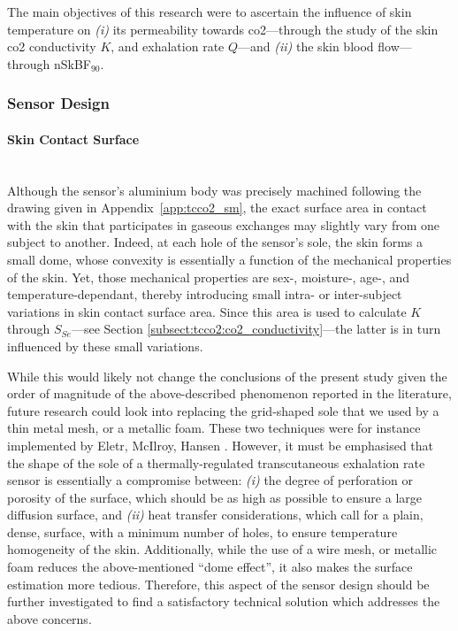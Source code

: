 The main objectives of this research were to ascertain the influence of skin temperature on \textit{(i)} its permeability towards \gls{co2}---through the study of the skin \gls{co2} conductivity $K$, and exhalation rate $Q$---and \textit{(ii)} the skin blood flow---through nSkBF$_{90}$.

\subsubsection{Sensor Design}

\paragraph{Skin Contact Surface}\label{subsect:tcco2:skin_surface}\makebox{}\\

Although the sensor's aluminium body was precisely machined following the drawing given in Appendix~\ref{app:tcco2_sm}, the exact surface area in contact with the skin that participates in gaseous exchanges may slightly vary from one subject to another. Indeed, at each hole of the sensor's sole, the skin forms a small dome, whose convexity is essentially a function of the mechanical properties of the skin. Yet, those mechanical properties are sex-, moisture-, age-, and temperature-dependant\cite{salter1993, held2018}, thereby introducing small intra- or inter-subject variations in skin contact surface area. Since this area is used to calculate $K$ through $S_{Se}$---see Section \ref{subsect:tcco2:co2_conductivity}---the latter is in turn influenced by these small variations.

While this would likely not change the conclusions of the present study given the order of magnitude of the above-described phenomenon reported in the literature, \mfrin{}future research could look into replacing the grid-shaped sole that we used by a thin metal mesh, or a metallic foam. These two techniques were for instance implemented by Eletr, McIlroy, Hansen \etal{}\cite{eletr1978, mcilroy1978, hansen1980}. However, it must be emphasised that the shape of the sole of a thermally-regulated transcutaneous exhalation rate sensor is essentially a compromise between: \emph{(i)} the degree of perforation or porosity of the surface, which should be as high as possible to ensure a large diffusion surface, and \emph{(ii)} heat transfer considerations, which call for a plain, dense, surface, with a minimum number of holes, to ensure temperature homogeneity of the skin. Additionally, while the use of a wire mesh, or metallic foam reduces the above-mentioned \enquote{dome effect}, it also makes the surface estimation more tedious. Therefore, this aspect of the sensor design should be further investigated to find a satisfactory technical solution which addresses the above concerns.

